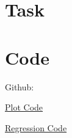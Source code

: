 \documentclass[a4paper, 11pt]{article}
\begin{document}
\section{Task}



\newpage

\section{Code}

Github:

\href{https://github.com/Flova/DAIS/blob/master/%C3%9Cbung%201/exercise1.py}{Plot Code}

\href{https://github.com/Flova/DAIS/blob/master/%C3%9Cbung%201/DAMI2_simpleRegression.py}{Regression Code}
\end{document}
